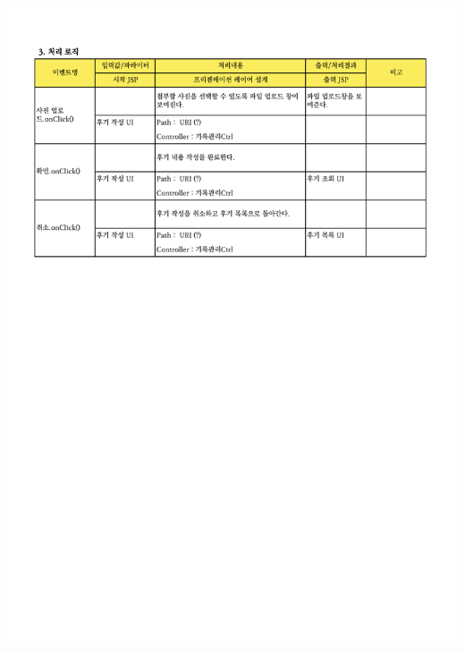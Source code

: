 {{{{{{{{{{{{{{{{{{{{{{{{{{{{{{{{{{{{{{{{{{{{{{{{{{{{{{{{{{{{{{{{{{{{{{{\includegraphics[width=20cm]{./Figure/Design/Display/review/review_02.pdf} \\
}}}}}}}}}}}}}}}}}}}}}}}}}}}}}}}}}}}}}}}}}}}}}}}}}}}}}}}}}}}}}}}}}}}}}}}
